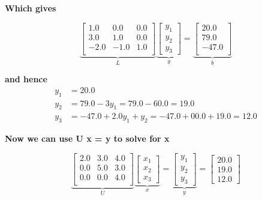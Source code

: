 \vspace*{2cm}

\textbf{\LARGE Which gives}

\begin{equation}
\underbrace{\left[
\begin{array}{rrr}
1.0 & 0.0 & 0.0 \\
3.0 & 1.0 & 0.0 \\
-2.0 & -1.0 & 1.0 \\
\end{array}
\right]}_{L}  \underbrace{\left[\begin{array}{c} y_1 \\ y_2 \\y_3 \end{array}\right]}_{y}= 
\underbrace{\left[
\begin{array}{c}
20.0 \\
79.0 \\
-47.0 \\
\end{array}
\right]}_{b}
\end{equation}

\textbf{\LARGE and hence}
\begin{equation}
\begin{aligned}
y_1 &= 20.0\\
y_2 &= 79.0 - 3 y_1 = 79.0 - 60.0 = 19.0 \\
y_3 &= -47.0 + 2.0 y_1 + y_2 = -47.0 + 00.0 + 19.0= 12.0
\end{aligned}
\end{equation}

\newpage

\textbf{\LARGE Now we can use U x = y to solve for x}


\vspace*{2cm}

\begin{equation}
    \underbrace{\left[
\begin{array}{ccc}
2.0 & 3.0 & 4.0 \\
0.0 & 5.0 & 3.0 \\
0.0 & 0.0 & 4.0 \\
\end{array}
\right]}_{U} \underbrace{\left[\begin{array}{c} x_1 \\ x_2 \\x_3 \end{array}\right]}_{x} = \underbrace{\left[\begin{array}{c} y_1 \\ y_2 \\y_3 \end{array}\right]}_{y} = \left[\begin{array}{c}20.0 \\ 19.0\\12.0 \end{array}\right]
\end{equation}

